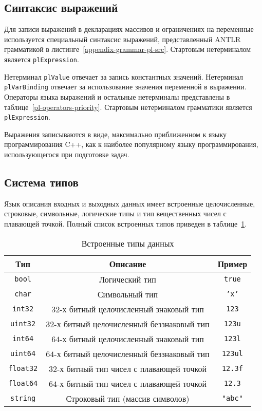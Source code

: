 \documentclass[times,specification,annotation]{style/itmo-student-thesis/itmo-student-thesis}
\begin{document}
\subsection{Синтаксис выражений}

Для записи выражений в декларациях массивов и ограничениях на переменные используется специальный синтаксис выражений, представленный ANTLR грамматикой в листинге~\ref{appendix-grammar-pl-src}. Стартовым нетерминалом является \texttt{plExpression}.

Нетерминал \texttt{plValue} отвечает за запись константных значений. Нетерминал \texttt{plVarBinding} отвечает за использование значения переменной в выражении. Операторы языка выражений и остальные нетерминалы представлены в таблице~\ref{pl-operators-priority}. Стартовым нетерминалом грамматики является \texttt{plExpression}.

Выражения записываются в виде, максимально приближенном к языку программирования C++, как к наиболее популярному языку программирования, использующегося при подготовке задач.

\subsection{Система типов}

Язык описания входных и выходных данных имеет встроенные целочисленные, строковые, символьные, логические типы и тип вещественных чисел с плавающей точкой. Полный список встроенных типов приведен в таблице~\ref{predefined-types}.

\begin{table}[!h]
\caption{Встроенные типы данных}\label{predefined-types}
\centering
\begin{tabular}{|*{3}{c|}}\hline
Тип & Описание & Пример\\\hline
\texttt{bool} & Логический тип & \texttt{true} \\\hline
\texttt{char} & Символьный тип & \texttt{'x'}\\\hline
\texttt{int32} & $32$-х битный целочисленный знаковый тип & \texttt{123} \\\hline
\texttt{uint32} & $32$-х битный целочисленный беззнаковый тип & \texttt{123u} \\\hline
\texttt{int64} & $64$-х битный целочисленный знаковый тип & \texttt{123l} \\\hline
\texttt{uint64} & $64$-х битный целочисленный беззнаковый тип & \texttt{123ul} \\\hline
\texttt{float32} & $32$-х битный тип чисел с плавающей точкой & \texttt{12.3f} \\\hline
\texttt{float64} & $64$-х битный тип чисел с плавающей точкой & \texttt{12.3} \\\hline
\texttt{string} & Строковый тип (массив символов) & \texttt{"abc"} \\\hline
\end{tabular}
\end{table}
\end{document}
